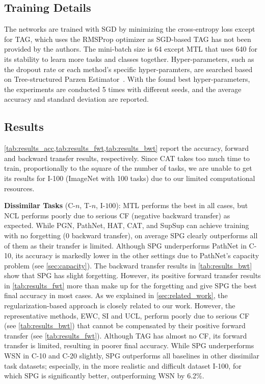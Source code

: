 \subsection{Training Details} \label{sec:training_details}
The networks are trained with SGD by minimizing the cross-entropy loss except for TAG, which uses the RMSProp optimizer as SGD-based TAG has not been provided by the authors.
The mini-batch size is 64 except MTL that uses 640 for its stability to learn more tasks and classes together.
Hyper-parameters, such as the dropout rate or each method's specific hyper-paramters, are searched based on Tree-structured Parzen Estimator~\citep{tpe}.
With the found best hyper-parameters, the experiments are conducted 5 times with different seeds, and the average accuracy and standard deviation are reported.











\subsection{Results} \label{sec:results}






\cref{tab:results_acc,tab:results_fwt,tab:results_bwt} report the accuracy, forward and backward transfer results, respectively. 
Since CAT takes too much time to train, proportionally to the square of the number of tasks, we are unable to get its results for I-100 (ImageNet with 100 tasks) due to our limited computational resources.








\textbf{Dissimilar Tasks} (C-$n$, T-$n$, I-$100$):
MTL performs the best in all cases, but NCL performs poorly due to serious CF (negative backward transfer) as expected. While PGN, PathNet, HAT, CAT, and SupSup can achieve training with no forgetting (0 backward transfer), on average SPG clearly outperforms all of them as their transfer is limited. Although SPG  underperforms PathNet in C-10, its accuracy is markedly lower in the other settings due to PathNet's capacity problem (see \cref{sec:capacity}).
The backward transfer results in \cref{tab:results_bwt} show that SPG has slight forgetting. However, its positive forward transfer results in \cref{tab:results_fwt} more than make up for the forgetting and give SPG the best final accuracy in most cases. 
As we explained in \cref{sec:related_work}, the regularization-based approach is closely related to our work. However, the representative methods, EWC, SI and UCL, perform poorly due to serious CF (see \cref{tab:results_bwt}) that cannot be compensated by their positive forward transfer (see \cref{tab:results_fwt}). 
Although TAG has almost no CF, its forward transfer is limited, resulting in poorer final accuracy.
While SPG underperforms WSN in C-10 and C-20 slightly, SPG outperforms all baselines in other dissimilar task datasets; especially, in the more realistic and difficult dataset I-100, for which SPG is significantly better, outperforming WSN by 6.2\%.

